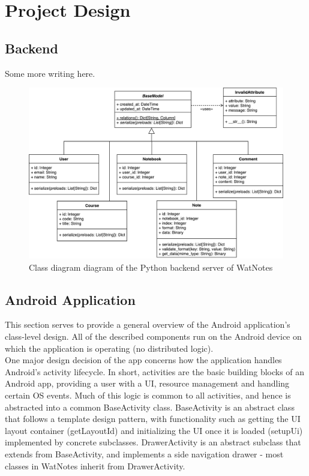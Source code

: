 \documentclass[12pt]{article}
\begin{document}
  \newpage

  \section{Project Design}
  \subsection{Backend}
    Some more writing here.
    \begin{figure}[H]
      \includegraphics[width=\textwidth]{assets/backend-class.pdf}
      \caption{Class diagram diagram of the Python backend server of WatNotes}
    \end{figure}

  \subsection{Android Application}
    This section serves to provide a general overview of the Android application's class-level design. All of the described components run on the Android
    device on which the application is operating (no distributed logic). \\

    One major design decision of the app concerns how the application handles Android's activity lifecycle. In short, activities are the basic building blocks of
    an Android app, providing a user with a UI, resource management and handling certain OS events. Much of this logic is common to all activities, and
    hence is abstracted into a common BaseActivity class. BaseActivity is an abstract class that follows a template design pattern, with functionality
    such as getting the UI layout container (getLayoutId) and initializing the UI once it is loaded (setupUi) implemented by concrete subclasses. DrawerActivity
    is an abstract subclass that extends from BaseActivity, and implements a side navigation drawer - most classes in WatNotes inherit from DrawerActivity. \\
\end{document}
